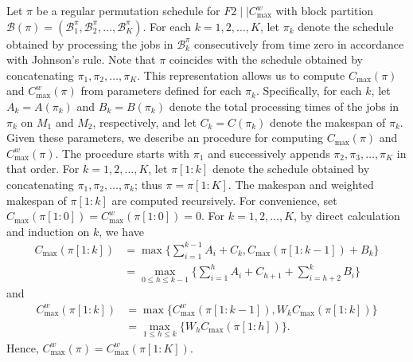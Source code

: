 \documentclass[12pt]{article} \textheight=24.5cm \textwidth=16.5cm \parskip = 0.165cm
\begin{document}
\begin{sloppypar}
        Let $\pi$ be a regular permutation schedule for $F2 \mid \mid C_{\max}^w$ with block partition $\mathcal{B}(\pi)=(\mathcal{B}_1^{\pi}, \mathcal{B}_2^{\pi}, \ldots, \mathcal{B}_K^{\pi})$.
        For each $k=1, 2, \ldots, K$, let $\pi_k$ denote the schedule obtained by processing the jobs in $\mathcal{B}_k^{\pi}$ consecutively from time zero in accordance with Johnson’s rule.
        Note that $\pi$ coincides with the schedule obtained by concatenating $\pi_1, \pi_2, \ldots, \pi_K$.
        This representation allows us to compute $C_{\max}(\pi)$ and $C_{\max}^w(\pi)$ from parameters defined for each $\pi_k$.
        Specifically, for each $k$, let $A_k=A(\pi_k)$ and $B_k=B(\pi_k)$ denote the total processing times of the jobs in $\pi_k$ on $M_1$ and $M_2$, respectively, and let $C_k=C(\pi_k)$ denote the makespan of $\pi_k$.
        Given these parameters, we describe an procedure for computing $C_{\max}(\pi)$ and $C_{\max}^w(\pi)$.
        The procedure starts with $\pi_1$ and successively appends $\pi_2, \pi_3, \ldots, \pi_K$ in that order.
        For $k=1, 2, \ldots, K$, let $\pi[1:k]$ denote the schedule obtained by concatenating $\pi_1, \pi_2, \ldots, \pi_k$; thus $\pi=\pi[1:K]$.
        The makespan and weighted makespan of $\pi[1: k]$ are computed recursively.
        For convenience, set $C_{\max}(\pi[1: 0])=C_{\max}^w(\pi[1: 0])=0$.
        For $k=1, 2, \ldots, K$, by direct calculation and induction on $k$, we have
        \begin{equation}
            \begin{aligned} \label{eq-4.2:block-makespan}
                C_{\max}(\pi[1: k]) &=\max \Big\{\sum_{i=1}^{k-1} A_i+C_k, C_{\max}(\pi[1: k-1])+B_k\Big\}  \\
                &= \max_{0 \leq h \leq k-1} \Big\{ \sum_{i=1}^h A_i +C_{h+1} + \sum_{i=h+2}^k B_i \Big\}
            \end{aligned}
        \end{equation}
        and
        \begin{equation}\label{eq-4.2:block-weighted makespan}
            \begin{aligned}
                C_{\max}^w(\pi[1: k]) &=\max \{C_{\max}^w(\pi[1: k-1]), W_k C_{\max}(\pi[1: k])\}  \\
                &= \max_{1 \leq h \leq k} \{W_h C_{\max}(\pi[1: h])\}.
            \end{aligned}
        \end{equation}
        Hence, $C_{\max}^w(\pi)=C_{\max}^w(\pi[1: K])$.
        

\end{sloppypar}
\end{document}
